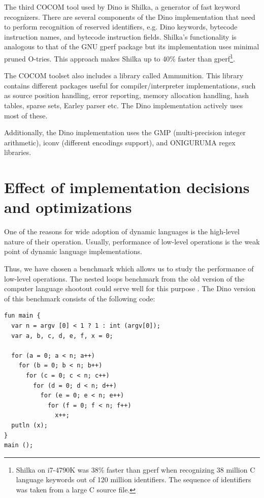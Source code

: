 \documentclass[preprint]{sigplanconf}
\begin{document}
The third COCOM tool used by Dino is Shilka, a generator of fast keyword recognizers.
There are several components of the Dino implementation that need to perform recognition
of reserved identifiers, e.g. Dino keywords, bytecode instruction
names, and bytecode instruction fields.  Shilka's functionality is analogous to that of the GNU
gperf package but its implementation uses minimal pruned O-tries.  This approach makes Shilka
up to 40\% faster than gperf\footnote{Shilka on i7-4790K was 38\%
  faster than gperf when recognizing 38 million C language keywords
  out of 120 million identifiers.  The sequence of identifiers was taken from a
  large C source file.}.

The COCOM toolset also includes a library called Ammunition. This library contains
different packages useful for compiler/interpreter implementations, such as
source position handling, error reporting, memory allocation handling,
hash tables, sparse sets, Earley parser etc.  The Dino implementation
actively uses most of these.

Additionally, the Dino implementation uses the GMP (multi-precision
integer arithmetic), iconv (different encodings support), and ONIGURUMA regex libraries.

\section{Effect of implementation decisions and optimizations}
\label{model_benchmarks}

  One of the reasons for wide adoption of dynamic languages is the
high-level nature of their operation.  Usually, performance of low-level
operations is the weak point of dynamic language implementations.

  Thus, we have chosen a benchmark which allows us to study the
performance of low-level operations. The nested loops benchmark from the old
version of the
computer language shootout could serve well for
this purpose \cite{Benchmarks}.  The Dino version of this benchmark consists of the following code:

{\scriptsize
\begin{verbatim}
fun main {
  var n = argv [0] < 1 ? 1 : int (argv[0]);
  var a, b, c, d, e, f, x = 0;

  for (a = 0; a < n; a++)
    for (b = 0; b < n; b++)
      for (c = 0; c < n; c++)
        for (d = 0; d < n; d++)
          for (e = 0; e < n; e++)
            for (f = 0; f < n; f++)
              x++;
  putln (x);
}
main ();
\end{verbatim}
}
\end{document}
